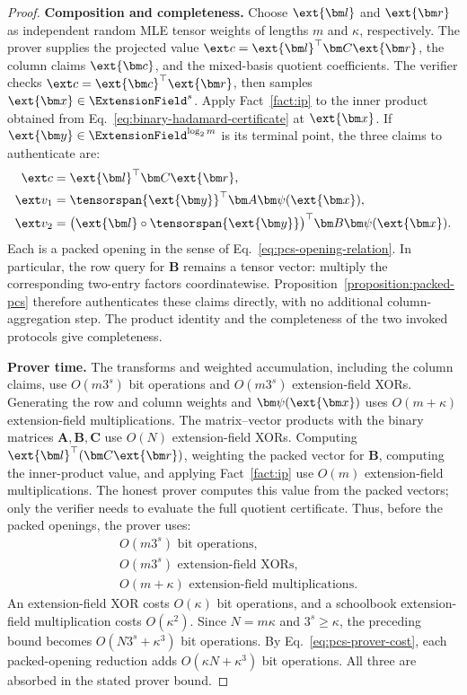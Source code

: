 \begin{proof}
\noindent\textbf{Composition and completeness.}
Choose \(\ext{\bm l}\) and \(\ext{\bm r}\) as independent
random MLE tensor weights of lengths \(m\) and \(\kappa\),
respectively. The prover supplies the projected value
\(\ext c=\ext{\bm l}^{\top}\bm C\ext{\bm r}\), the column
claims \(\ext{\bm c}\), and the mixed-basis quotient coefficients.
The verifier checks \(\ext c=\ext{\bm c}^{\top}\ext{\bm r}\),
then samples \(\ext{\bm x}\in\ExtensionField^s\).
Apply Fact~\ref{fact:ip} to the inner product obtained from
Eq.~\eqref{eq:binary-hadamard-certificate} at \(\ext{\bm x}\).
If \(\ext{\bm y}\in\ExtensionField^{\log_2m}\) is its terminal
point, the three claims to authenticate are:
\[
\begin{aligned}
    \ext c
      &=\ext{\bm l}^{\top}\bm C\ext{\bm r},\\
    \ext v_1
      &=\tensorspan{\ext{\bm y}}^{\top}
          \bm A\bm\psi(\ext{\bm x}),\\
    \ext v_2
      &=\bigl(\ext{\bm l}\circ
          \tensorspan{\ext{\bm y}}\bigr)^{\top}
          \bm B\bm\psi(\ext{\bm x}).
\end{aligned}
\]
Each is a packed opening in the sense of
Eq.~\eqref{eq:pcs-opening-relation}.
In particular, the row query for \(\bm B\) remains a tensor
vector: multiply the corresponding two-entry factors
coordinatewise. Proposition~\ref{proposition:packed-pcs}
therefore authenticates these claims directly, with no additional
column-aggregation step. The product identity and the
completeness of the two invoked protocols give completeness.

\smallskip\noindent\textbf{Prover time.}
The transforms and weighted accumulation, including the column
claims, use \(O(m3^s)\) bit operations and
\(O(m3^s)\) extension-field XORs.
Generating the row and column weights and
\(\bm\psi(\ext{\bm x})\) uses \(O(m+\kappa)\)
extension-field multiplications.
The matrix--vector products with the binary matrices
\(\bm A,\bm B,\bm C\) use \(O(N)\) extension-field XORs.
Computing \(\ext{\bm l}^{\top}(\bm C\ext{\bm r})\),
weighting the packed vector for \(\bm B\), computing the
inner-product value, and applying Fact~\ref{fact:ip} use
\(O(m)\) extension-field multiplications.
The honest prover computes this value from the packed vectors;
only the verifier needs to evaluate the full quotient certificate.
Thus, before the packed openings, the prover uses:
\[
\begin{aligned}
    &O(m3^s)\text{ bit operations},\\
    &O(m3^s)\text{ extension-field XORs},\\
    &O(m+\kappa)\text{ extension-field multiplications}.
\end{aligned}
\]
An extension-field XOR costs \(O(\kappa)\) bit operations,
and a schoolbook extension-field multiplication costs
\(O(\kappa^2)\). Since \(N=m\kappa\) and \(3^s\geq\kappa\),
the preceding bound becomes \(O(N3^s+\kappa^3)\) bit operations.
By Eq.~\eqref{eq:pcs-prover-cost}, each packed-opening reduction
adds \(O(\kappa N+\kappa^3)\) bit operations.
All three are absorbed in the stated prover bound.


\end{proof}
